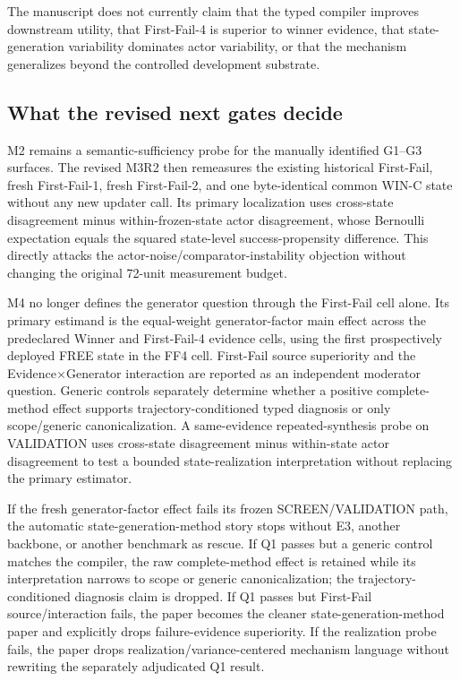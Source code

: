 The manuscript does not currently claim that the typed compiler improves downstream utility, that First-Fail-4 is superior to winner evidence, that state-generation variability dominates actor variability, or that the mechanism generalizes beyond the controlled development substrate.

\subsection{What the revised next gates decide}
M2 remains a semantic-sufficiency probe for the manually identified G1--G3 surfaces. The revised M3R2 then remeasures the existing historical First-Fail, fresh First-Fail-1, fresh First-Fail-2, and one byte-identical common WIN-C state without any new updater call. Its primary localization uses cross-state disagreement minus within-frozen-state actor disagreement, whose Bernoulli expectation equals the squared state-level success-propensity difference. This directly attacks the actor-noise/comparator-instability objection without changing the original 72-unit measurement budget.

M4 no longer defines the generator question through the First-Fail cell alone. Its primary estimand is the equal-weight generator-factor main effect across the predeclared Winner and First-Fail-4 evidence cells, using the first prospectively deployed FREE state in the FF4 cell. First-Fail source superiority and the Evidence$\times$Generator interaction are reported as an independent moderator question. Generic controls separately determine whether a positive complete-method effect supports trajectory-conditioned typed diagnosis or only scope/generic canonicalization. A same-evidence repeated-synthesis probe on VALIDATION uses cross-state disagreement minus within-state actor disagreement to test a bounded state-realization interpretation without replacing the primary estimator.

If the fresh generator-factor effect fails its frozen SCREEN/VALIDATION path, the automatic state-generation-method story stops without E3, another backbone, or another benchmark as rescue. If Q1 passes but a generic control matches the compiler, the raw complete-method effect is retained while its interpretation narrows to scope or generic canonicalization; the trajectory-conditioned diagnosis claim is dropped. If Q1 passes but First-Fail source/interaction fails, the paper becomes the cleaner state-generation-method paper and explicitly drops failure-evidence superiority. If the realization probe fails, the paper drops realization/variance-centered mechanism language without rewriting the separately adjudicated Q1 result.
